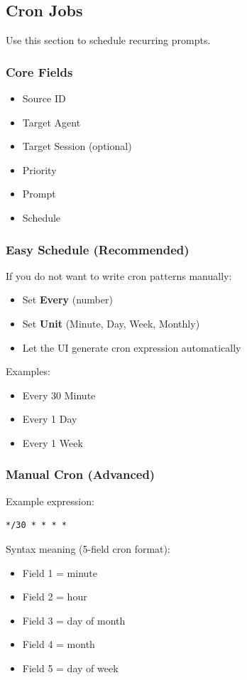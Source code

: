\documentclass{article}
\begin{document}
\subsection{Cron Jobs}

Use this section to schedule recurring prompts.

\subsubsection{Core Fields}
\begin{itemize}
	\item Source ID
	\item Target Agent
	\item Target Session (optional)
	\item Priority
	\item Prompt
	\item Schedule
\end{itemize}

\subsubsection{Easy Schedule (Recommended)}
If you do not want to write cron patterns manually:
\begin{itemize}
	\item Set \textbf{Every} (number)
	\item Set \textbf{Unit} (Minute, Day, Week, Monthly)
	\item Let the UI generate cron expression automatically
\end{itemize}

Examples:
\begin{itemize}
	\item Every 30 Minute
	\item Every 1 Day
	\item Every 1 Week
\end{itemize}

\subsubsection{Manual Cron (Advanced)}
Example expression:
\begin{verbatim}
*/30 * * * *
\end{verbatim}

Syntax meaning (5-field cron format):
\begin{itemize}
	\item Field 1 = minute
	\item Field 2 = hour
	\item Field 3 = day of month
	\item Field 4 = month
	\item Field 5 = day of week
\end{itemize}
\end{document}
